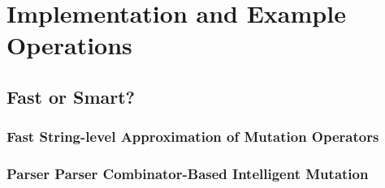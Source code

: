 \section{Implementation and Example Operations}

\subsection{Fast or Smart?}

\subsubsection{Fast String-level Approximation of Mutation Operators}

\subsubsection{Parser Parser Combinator-Based Intelligent Mutation}